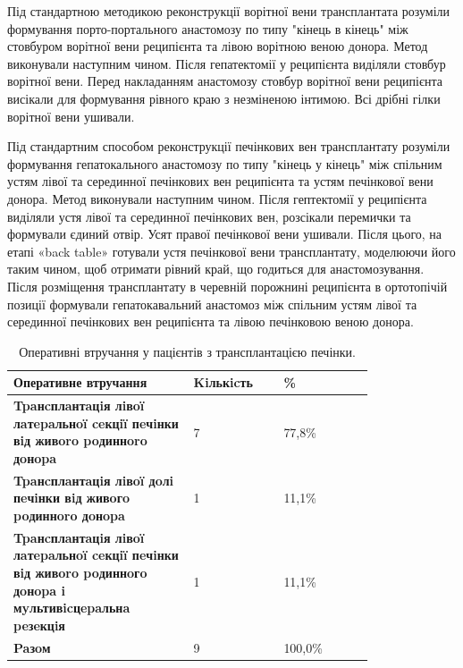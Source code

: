 Під стандартною методикою реконструкції ворітної вени трансплантата розуміли формування порто-портального анастомозу по типу "кінець в кінець"  між стовбуром ворітної вени реципієнта та лівою ворітною веною донора. Метод виконували наступним чином. Після гепатектомії у реципієнта виділяли стовбур ворітної вени. Перед накладанням анастомозу стовбур ворітної вени реципієнта висікали для формування рівного краю з незміненою інтимою. Всі дрібні гілки ворітної вени ушивали. 

Під стандартним способом реконструкції печінкових вен трансплантату розуміли формування гепатокального анастомозу по типу "кінець у кінець" між спільним устям лівої та серединної печінкових вен реципієнта та устям печінкової вени донора. Метод виконували наступним чином. Після гептектомії у реципієнта виділяли устя лівої та серединної печінкових вен, розсікали перемички та формували єдиний отвір. Усят правої печінкової вени ушивали. Після цього, на етапі «back table» готували устя печінкової вени трансплантату, моделюючи його таким чином, щоб отримати рівний край, що годиться для анастомозування. Після розміщення трансплантату в черевній порожнині реципієнта в ортотопічій позиції формували гепатокавальний анастомоз між спільним устям лівої та серединної печінкових вен реципієнта та лівою печінковою веною донора.

\begin{table}[]
\centering
\caption{Оперативні втручання у пацієнтів з трансплантацією печінки.}
\label{tab:ldlt}
\begin{tabular}{|p{0.4\linewidth}|
                 p{0.2\linewidth}|
                 p{0.2\linewidth}|}
\hline
\textbf{Оперативне втручання} &
\textbf{Kiлькicть} &
  \textbf{\%} \\ \hline
\textbf{Tpaнcплaнтaцiя лiвoï лaтepaльнoï ceкцiï пeчiнки вiд живoro poдиннoro дoнopa} & 7 & 77,8\%  \\ \hline
\textbf{Tpaнcплaнтaцiя лiвoï дoлi пeчiнки вiд живoгo poдиннoro дoнopa}               & 1 & 11,1\%  \\ \hline
\textbf{Tpaнcплaнтaцiя лiвoï лaтepaльнoï ceкцiï пeчiнки вiд живoro poдиннoгo дoнopa i мyльтивicцepaльнa peзeкцiя} &
  1 &
  11,1\% \\ \hline
\textbf{Paзoм}                                                                       & 9 & 100,0\% \\ \hline
\end{tabular}
\end{table}










